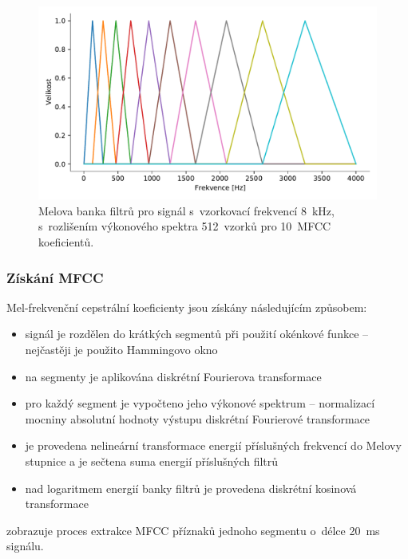 \begin{figure}[ht]
  \centering
  \includegraphics[width=\linewidth]{obrazky-figures/mel_bank.pdf}
  \caption{Melova banka filtrů pro signál s~vzorkovací frekvencí 8~kHz, s~rozlišením výkonového spektra 512~vzorků pro 10~MFCC koeficientů.}
  \label{fig:Mel_filter_bank}
\end{figure}


\subsubsection{Získání MFCC}
Mel-frekvenční cepstrální koeficienty jsou získány následujícím způsobem:
\begin{itemize}
    \item signál je rozdělen do krátkých segmentů při použití okénkové funkce -- nejčastěji je použito Hammingovo okno
    \item na segmenty je aplikována diskrétní Fourierova transformace 
    \item pro každý segment je vypočteno jeho výkonové spektrum -- normalizací mocniny absolutní hodnoty výstupu diskrétní Fourierové transformace
    \item je provedena nelineární transformace energií příslušných frekvencí do Melovy stupnice a je sečtena suma energií příslušných filtrů 
    \item nad logaritmem energií banky filtrů je provedena diskrétní kosinová transformace
\end{itemize}
 zobrazuje proces extrakce MFCC příznaků jednoho segmentu o~délce 20~ms signálu.

